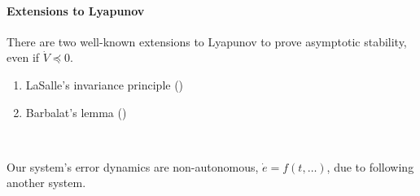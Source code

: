 \paragraph{Extensions to Lyapunov}
There are two well-known extensions to Lyapunov to prove
asymptotic stability, even if $\dot{V} \preceq 0$.
\begin{enumerate}
\item LaSalle's invariance principle
    ()
\item Barbalat's lemma
    ()
\end{enumerate}~

Our system's error dynamics are non-autonomous,
$\dot{e} = f(t, \dots)$, due to
following another system.
\begin{figure}[H]
\centering
{}
\end{figure}

